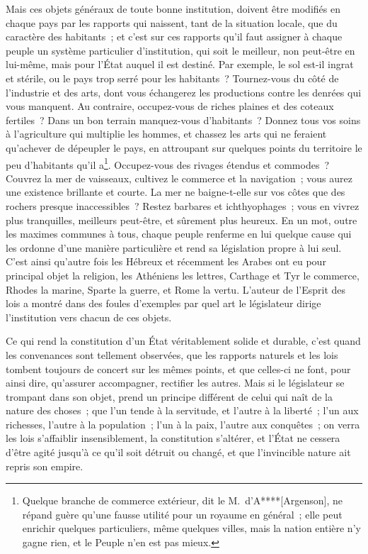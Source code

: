 \documentclass[french,twoside]{book} %
\begin{document}
Mais ces objets généraux de toute bonne institution, doivent être modifiés en chaque pays par les rapports qui naissent, tant de la situation locale, que du caractère des habitants ; et c’est sur ces rapports qu’il faut assigner à chaque peuple un système particulier d’institution, qui soit le meilleur, non peut-être en lui-même, mais pour l’État auquel il est destiné. Par exemple, le sol est-il ingrat et stérile, ou le pays trop serré pour les habitants ? Tournez-vous du côté de l’industrie et des arts, dont vous échangerez les productions contre les denrées qui vous manquent. Au contraire, occupez-vous de riches plaines et des coteaux fertiles ? Dans un bon terrain manquez-vous d’habitants ? Donnez tous vos soins à l’agriculture qui multiplie les hommes, et chassez les arts qui ne feraient qu’achever de dépeupler le pays, en attroupant sur quelques points du territoire le peu d’habitants qu’il a\footnote{Quelque branche de commerce extérieur, dit le M. d’A****[Argenson], ne répand guère qu’une fausse utilité pour un royaume en général ; elle peut enrichir quelques particuliers, même quelques villes, mais la nation entière n’y gagne rien, et le Peuple n’en est pas mieux.}. Occupez-vous des rivages étendus et commodes ? Couvrez la mer de vaisseaux, cultivez le commerce et la navigation ; vous aurez une existence brillante et courte. La mer ne baigne-t-elle sur vos côtes que des rochers presque inaccessibles ? Restez barbares et ichthyophages ; vous en vivrez plus tranquilles, meilleurs peut-être, et sûrement plus heureux. En un mot, outre les maximes communes à tous, chaque peuple renferme en lui quelque cause qui les ordonne d’une manière particulière et rend sa législation propre à lui seul. C’est ainsi qu’autre fois les Hébreux et récemment les Arabes ont eu pour principal objet la religion, les Athéniens les lettres, Carthage et Tyr le commerce, Rhodes la marine, Sparte la guerre, et Rome la vertu. L’auteur de l’Esprit des lois a montré dans des foules d’exemples par quel art le législateur dirige l’institution vers chacun de ces objets.\par
Ce qui rend la constitution d’un État véritablement solide et durable, c’est quand les convenances sont tellement observées, que les rapports naturels et les lois tombent toujours de concert sur les mêmes points, et que celles-ci ne font, pour ainsi dire, qu’assurer accompagner, rectifier les autres. Mais si le législateur se trompant dans son objet, prend un principe différent de celui qui naît de la nature des choses ; que l’un tende à la servitude, et l’autre à la liberté ; l’un aux richesses, l’autre à la population ; l’un à la paix, l’autre aux conquêtes ; on verra les lois s’affaiblir insensiblement, la constitution s’altérer, et l’État ne cessera d’être agité jusqu’à ce qu’il soit détruit ou changé, et que l’invincible nature ait repris son empire.
\end{document}
